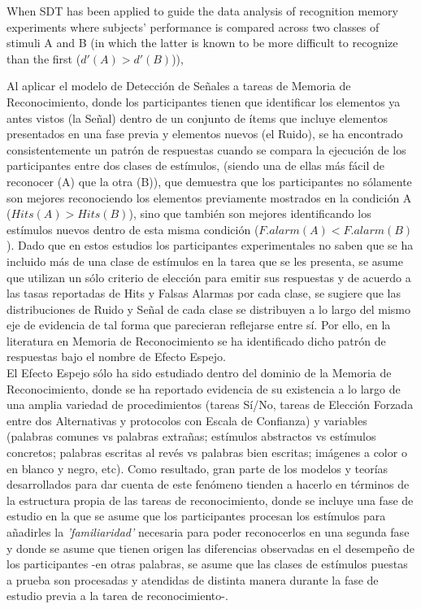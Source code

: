 \documentclass[jou,apacite]{apa6}
\begin{document}
When SDT has been applied to guide the data analysis of recognition memory experiments where subjects' performance is compared across two classes of stimuli A and B (in which the latter is known to be more difficult to recognize than the first ($d'(A)>d'(B)$)),

Al aplicar el modelo de Detección de Señales a tareas de Memoria de Reconocimiento, donde los participantes tienen que identificar los elementos ya antes vistos (la Señal) dentro de un conjunto de ítems que incluye elementos presentados en una fase previa y elementos nuevos (el Ruido), se ha encontrado consistentemente un patrón de respuestas cuando se compara la ejecución de los participantes entre dos clases de estímulos, (siendo una de ellas más fácil de reconocer (A) que la otra (B)), que demuestra que los participantes no sólamente son mejores reconociendo los elementos previamente mostrados en la condición A ($Hits(A)>Hits(B)$), sino que también son mejores identificando los estímulos nuevos dentro de esta misma condición ($F.alarm(A)<F.alarm(B)$). Dado que en estos estudios los participantes experimentales no saben que se ha incluido más de una clase de estímulos en la tarea que se les presenta, se asume que utilizan un sólo criterio de elección para emitir sus respuestas y de acuerdo a las tasas reportadas de Hits y Falsas Alarmas por cada clase, se sugiere que las distribuciones de Ruido y Señal de cada clase se distribuyen a lo largo del mismo eje de evidencia de tal forma que parecieran reflejarse entre sí. Por ello, en la literatura en Memoria de Reconocimiento se ha identificado dicho patrón de respuestas bajo el nombre de Efecto Espejo.\\

El Efecto Espejo sólo ha sido estudiado dentro del dominio de la Memoria de Reconocimiento, donde se ha reportado evidencia de su existencia a lo largo de una amplia variedad de procedimientos (tareas Sí/No, tareas de Elección Forzada entre dos Alternativas y protocolos con Escala de Confianza) y variables (palabras comunes vs palabras extrañas; estímulos abstractos vs estímulos concretos; palabras escritas al revés vs palabras bien escritas; imágenes a color o en blanco y negro, etc). Como resultado, gran parte de los modelos y teorías desarrollados para dar cuenta de este fenómeno tienden a hacerlo en términos de la estructura propia de las tareas de reconocimiento, donde se incluye una fase de estudio en la que se asume que los participantes procesan los estímulos para añadirles la \textit{'familiaridad'} necesaria para poder reconocerlos en una segunda fase y donde se asume que tienen origen las diferencias observadas en el desempeño de los participantes -en otras palabras, se asume que las clases de estímulos puestas a prueba son procesadas y atendidas de distinta manera durante la fase de estudio previa a la tarea de reconocimiento-.\\
\end{document}
